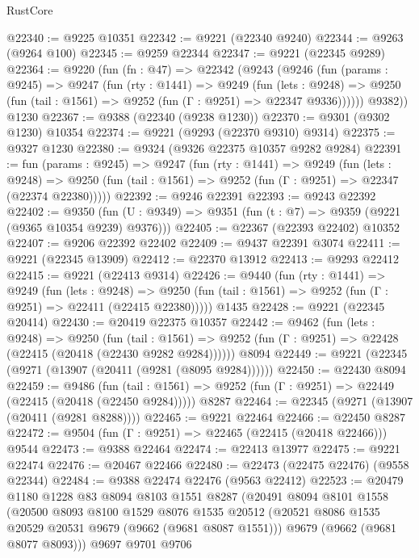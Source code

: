 \begin{lexlean}{RustCore}
\begin{coremodule}
@22340 := @9225 @10351
@22342 := @9221 (@22340 @9240)
@22344 := @9263 (@9264 @100)
@22345 := @9259 @22344
@22347 := @9221 (@22345 @9289)
@22364 := @9220
    (fun (fn : @47) =>
    @22342
      (@9243
        (@9246
          (fun (params : @9245) =>
          @9247
            (fun (rty : @1441) =>
            @9249
              (fun (lets : @9248) =>
              @9250 (fun (tail : @1561) => @9252 (fun (Γ : @9251) => @22347 @9336))))))
        @9382))
    @1230
@22367 := @9388 (@22340 (@9238 @1230))
@22370 := @9301 (@9302 @1230) @10354
@22374 := @9221 (@9293 (@22370 @9310) @9314)
@22375 := @9327 @1230
@22380 := @9324 (@9326 @22375 @10357 @9282 @9284)
@22391 := fun (params : @9245) =>
  @9247
    (fun (rty : @1441) =>
    @9249
      (fun (lets : @9248) =>
      @9250 (fun (tail : @1561) => @9252 (fun (Γ : @9251) => @22347 (@22374 @22380)))))
@22392 := @9246 @22391
@22393 := @9243 @22392
@22402 := @9350
    (fun (U : @9349) => @9351 (fun (t : @7) => @9359 (@9221 (@9365 @10354 @9239) @9376)))
@22405 := @22367 (@22393 @22402) @10352
@22407 := @9206 @22392 @22402
@22409 := @9437 @22391 @3074
@22411 := @9221 (@22345 @13909)
@22412 := @22370 @13912
@22413 := @9293 @22412
@22415 := @9221 (@22413 @9314)
@22426 := @9440
    (fun (rty : @1441) =>
    @9249
      (fun (lets : @9248) =>
      @9250 (fun (tail : @1561) => @9252 (fun (Γ : @9251) => @22411 (@22415 @22380)))))
    @1435
@22428 := @9221 (@22345 @20414)
@22430 := @20419 @22375 @10357
@22442 := @9462
    (fun (lets : @9248) =>
    @9250
      (fun (tail : @1561) =>
      @9252 (fun (Γ : @9251) => @22428 (@22415 (@20418 (@22430 @9282 @9284))))))
    @8094
@22449 := @9221 (@22345 (@9271 (@13907 (@20411 (@9281 (@8095 @9284))))))
@22450 := @22430 @8094
@22459 := @9486
    (fun (tail : @1561) => @9252 (fun (Γ : @9251) => @22449 (@22415 (@20418 (@22450 @9284)))))
    @8287
@22464 := @22345 (@9271 (@13907 (@20411 (@9281 @8288))))
@22465 := @9221 @22464
@22466 := @22450 @8287
@22472 := @9504 (fun (Γ : @9251) => @22465 (@22415 (@20418 @22466))) @9544
@22473 := @9388 @22464
@22474 := @22413 @13977
@22475 := @9221 @22474
@22476 := @20467 @22466
@22480 := @22473 (@22475 @22476) (@9558 @22344)
@22484 := @9388 @22474 @22476 (@9563 @22412)
@22523 := @20479
    @1180
    @1228
    @83
    @8094
    @8103
    @1551
    @8287
    (@20491
      @8094
      @8101
      @1558
      (@20500
        @8093
        @8100
        @1529
        @8076
        @1535
        @20512
        (@20521 @8086 @1535 @20529 @20531 @9679 (@9662 (@9681 @8087 @1551)))
        @9679
        (@9662 (@9681 @8077 @8093)))
      @9697
      @9701
      @9706

\end{coremodule}
\end{lexlean}
